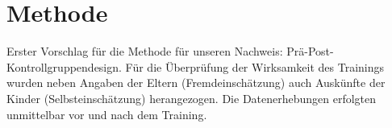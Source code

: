 %
%
\chapter{Methode}\label{chap.methode}
\glsresetall
Erster Vorschlag für die Methode für unseren Nachweis:\newline
Prä-Post-Kontrollgruppendesign.
Für die Überprüfung der Wirksamkeit des Trainings wurden neben Angaben der Eltern (Fremdeinschätzung) auch Auskünfte der Kinder (Selbsteinschätzung) herangezogen. Die Datenerhebungen erfolgten unmittelbar vor und nach dem Training. 
\cite{Ortbandt:2009}
